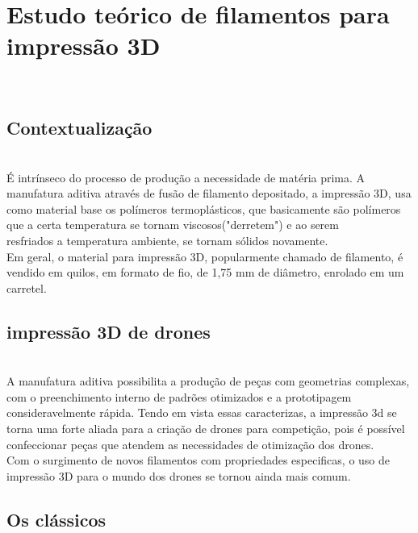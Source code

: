 \section{Estudo teórico de filamentos para impressão 3D}
\\[0.4cm]


\subsection{Contextualização} \\[0.2cm]



É intrínseco do processo de produção a necessidade de matéria prima. A manufatura aditiva através de fusão de filamento depositado, a impressão 3D, usa como material base os polímeros termoplásticos, que basicamente são polímeros que a certa temperatura se tornam viscosos("derretem") e ao serem \\[0.2cm] resfriados a temperatura ambiente, se tornam sólidos novamente.\\[0.2cm]

Em geral, o material para impressão 3D, popularmente chamado de filamento, é vendido em quilos, em formato de fio, de 1,75 mm de diâmetro, enrolado em um carretel.\\[0.2cm]





\subsection{impressão 3D de drones}\\[0.2cm]



A manufatura aditiva possibilita a produção de peças com geometrias complexas, com o preenchimento interno de padrões otimizados e a prototipagem consideravelmente rápida. Tendo em vista essas caracterizas, a impressão 3d se torna uma forte aliada para a criação de drones para competição, pois é possível confeccionar peças que atendem as necessidades de otimização dos drones. \\[0.2cm]



Com o surgimento de novos filamentos com propriedades especificas, o uso de impressão  3D para o mundo dos drones se tornou ainda mais comum.\\[0.2cm]



\subsection{Os clássicos} \\[0.2cm]



